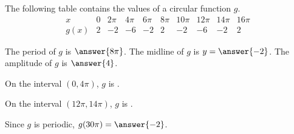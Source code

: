 \documentclass{ximera}
\author{Kenneth Berglund}
\begin{document}
\begin{exercise}
The following table contains the values of a circular function $g$. 
$$
\begin{array}{c|ccccccccc}
x&0&2\pi&4\pi&6\pi&8\pi&10\pi&12\pi&14\pi&16\pi\\
\hline
g(x)&2&-2&-6&-2&2&-2&-6&-2&2
\end{array}
$$

The period of $g$ is $\answer{8\pi}$. The midline of $g$ is $y = \answer{-2}$. The amplitude of $g$ is $\answer{4}$.

On the interval $(0, 4\pi)$, $g$ is .

On the interval $(12\pi, 14\pi)$, $g$ is .

Since $g$ is periodic, $g(30\pi) = \answer{-2}$. 


\end{exercise}
\end{document}
